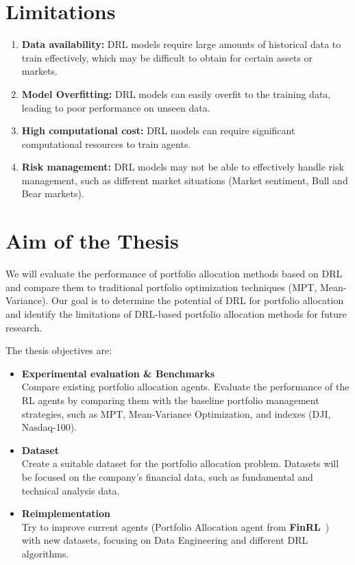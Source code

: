 \section{Limitations}\label{sec:limitations}

\begin{enumerate}
    \item \textbf{Data availability:} DRL models require large amounts of historical data to train effectively, which may be difficult to obtain for certain assets or markets.
    \item \textbf{Model Overfitting:} DRL models can easily overfit to the training data, leading to poor performance on unseen data.
    \item \textbf{High computational cost:} DRL models can require significant computational resources to train agents.
    \item \textbf{Risk management:} DRL models may not be able to effectively handle risk management, such as different market situations (Market sentiment, Bull and Bear markets).
\end{enumerate}


\section{Aim of the Thesis}\label{sec:aim-of-the-thesis}
We will evaluate the performance of portfolio allocation methods based on DRL and compare them to traditional portfolio optimization techniques (MPT, Mean-Variance).
Our goal is to determine the potential of DRL for portfolio allocation and identify the limitations of DRL-based portfolio allocation methods for future research.

The thesis objectives are:
\begin{itemize}
    \item \textbf{Experimental evaluation \& Benchmarks}\\
    Compare existing portfolio allocation agents.
    Evaluate the performance of the RL agents by comparing them with the baseline portfolio management strategies, such as MPT, Mean-Variance Optimization, and indexes (DJI, Nasdaq-100).
    \item \textbf{Dataset}\\
    Create a suitable dataset for the portfolio allocation problem.
    Datasets will be focused on the company's financial data, such as fundamental and technical analysis data.
    \item \textbf{Reimplementation}\\
    Try to improve current agents (Portfolio Allocation agent from \textbf{FinRL}~\cite{finrl-portfolio-allocation-2020}) with new datasets, focusing on Data Engineering and different DRL algorithms.
\end{itemize}

